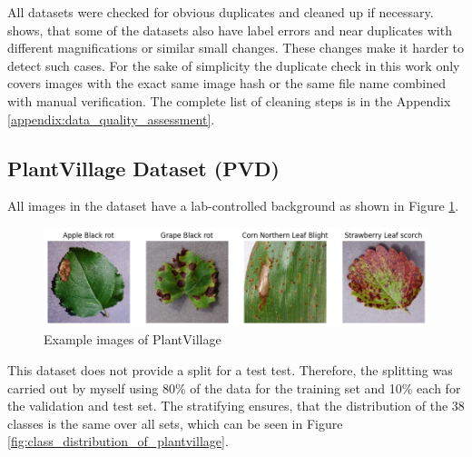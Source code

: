 All datasets were checked for obvious duplicates and cleaned up if necessary. \autocite{groeger2023} shows, that some of the datasets also have label errors and near duplicates with different magnifications or similar small changes. These changes make it harder to detect such cases. For the sake of simplicity the duplicate check in this work only covers images with the exact same image hash or the same file name combined with manual verification. The complete list of cleaning steps is in the Appendix \ref{appendix:data_quality_assessment}.

\subsection{PlantVillage Dataset (PVD)}
All images in the dataset have a lab-controlled background as shown in Figure \ref{fig:example_images_of_plantvillage}.

\begin{figure}[H]
    \begin{center}
    \includegraphics[width=15cm]{../images/example_images_of_plantvillage.png}
    \caption{Example images of PlantVillage}
    \label{fig:example_images_of_plantvillage}
    \end{center}
\end{figure}

This dataset does not provide a split for a test test. Therefore, the splitting was carried out by myself using 80\% of the data for the training set and 10\% each for the validation and test set. The stratifying ensures, that the distribution of the 38 classes is the same over all sets, which can be seen in Figure \ref{fig:class_distribution_of_plantvillage}. 

